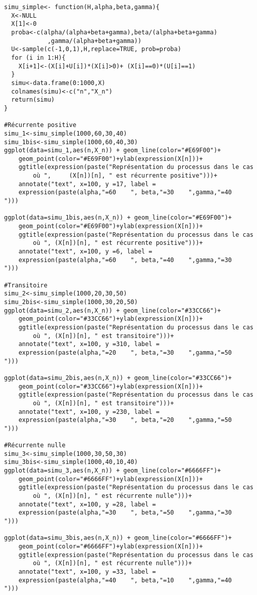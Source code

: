 \documentclass[12pt,a4paper]{report}
\theoremstyle{remark}
\begin{document}
\begin{lstlisting}
simu_simple<- function(H,alpha,beta,gamma){
  X<-NULL
  X[1]<-0
  proba<-c(alpha/(alpha+beta+gamma),beta/(alpha+beta+gamma)
            ,gamma/(alpha+beta+gamma))
  U<-sample(c(-1,0,1),H,replace=TRUE, prob=proba)
  for (i in 1:H){
    X[i+1]<-(X[i]+U[i])*(X[i]>0)+ (X[i]==0)*(U[i]==1)
  }
  simu<-data.frame(0:1000,X)
  colnames(simu)<-c("n","X_n")
  return(simu)
}

#Récurrente positive
simu_1<-simu_simple(1000,60,30,40)
simu_1bis<-simu_simple(1000,60,40,30)
ggplot(data=simu_1,aes(n,X_n)) + geom_line(color="#E69F00")+
    geom_point(color="#E69F00")+ylab(expression(X[n]))+ 
    ggtitle(expression(paste("Représentation du processus dans le cas 
        où ",     (X[n])[n], " est récurrente positive")))+
    annotate("text", x=100, y =17, label = 
    expression(paste(alpha,"=60    ", beta,"=30    ",gamma,"=40    ")))

ggplot(data=simu_1bis,aes(n,X_n)) + geom_line(color="#E69F00")+
    geom_point(color="#E69F00")+ylab(expression(X[n]))+
    ggtitle(expression(paste("Représentation du processus dans le cas
        où ", (X[n])[n], " est récurrente positive")))+
    annotate("text", x=100, y =6, label =
    expression(paste(alpha,"=60    ", beta,"=40    ",gamma,"=30    ")))

#Transitoire
simu_2<-simu_simple(1000,20,30,50)
simu_2bis<-simu_simple(1000,30,20,50)
ggplot(data=simu_2,aes(n,X_n)) + geom_line(color="#33CC66")+
    geom_point(color="#33CC66")+ylab(expression(X[n]))+ 
    ggtitle(expression(paste("Représentation du processus dans le cas 
        où ", (X[n])[n], " est transitoire")))+
    annotate("text", x=100, y =310, label = 
    expression(paste(alpha,"=20    ", beta,"=30    ",gamma,"=50    ")))
    
ggplot(data=simu_2bis,aes(n,X_n)) + geom_line(color="#33CC66")+
    geom_point(color="#33CC66")+ylab(expression(X[n]))+ 
    ggtitle(expression(paste("Représentation du processus dans le cas 
        où ", (X[n])[n], " est transitoire")))+
    annotate("text", x=100, y =230, label = 
    expression(paste(alpha,"=30    ", beta,"=20    ",gamma,"=50    ")))

#Récurrente nulle
simu_3<-simu_simple(1000,30,50,30)
simu_3bis<-simu_simple(1000,40,10,40)
ggplot(data=simu_3,aes(n,X_n)) + geom_line(color="#6666FF")+
    geom_point(color="#6666FF")+ylab(expression(X[n]))+ 
    ggtitle(expression(paste("Représentation du processus dans le cas
        où ", (X[n])[n], " est récurrente nulle")))+
    annotate("text", x=100, y =28, label = 
    expression(paste(alpha,"=30    ", beta,"=50    ",gamma,"=30    ")))

ggplot(data=simu_3bis,aes(n,X_n)) + geom_line(color="#6666FF")+
    geom_point(color="#6666FF")+ylab(expression(X[n]))+ 
    ggtitle(expression(paste("Représentation du processus dans le cas 
        où ", (X[n])[n], " est récurrente nulle")))+
    annotate("text", x=100, y =33, label =
    expression(paste(alpha,"=40    ", beta,"=10    ",gamma,"=40    ")))
\end{lstlisting}
\end{document}
